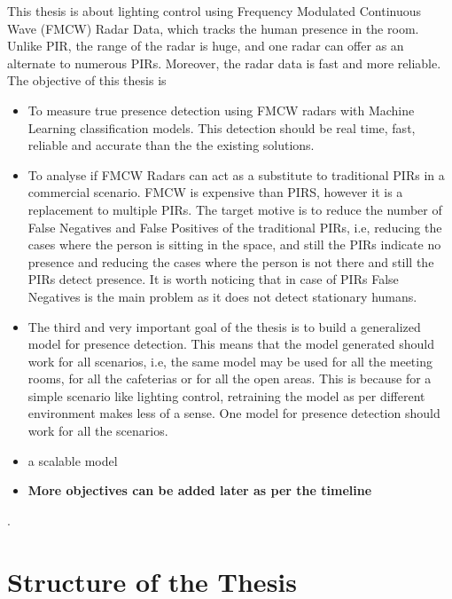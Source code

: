 This thesis is about lighting control using Frequency Modulated Continuous Wave (FMCW) Radar Data, which tracks the human presence in the room. 
Unlike PIR, the range of the radar is huge, and one radar can offer as an alternate to numerous PIRs. Moreover, the radar data is fast and more reliable. The objective of this thesis is 
\begin{itemize}
    \item To measure true presence detection using FMCW radars with Machine Learning classification models. This detection should be real time, fast, reliable and accurate than the the existing solutions.
    \item To analyse if FMCW Radars can act as a substitute to traditional PIRs in a commercial scenario. FMCW is expensive than PIRS, however it is a replacement to multiple PIRs. The target motive is to reduce the number of False Negatives and False Positives of the traditional PIRs, i.e, reducing the cases where the person is sitting in the space, and still the PIRs indicate no presence and reducing the cases where the person is not there and still the PIRs detect presence. It is worth noticing that in case of PIRs False Negatives is the main problem as it does not detect stationary humans. 
    \item The third and very important goal of the thesis is to build a generalized model for presence detection. This means that the model generated should work for all scenarios, i.e, the same model may be used for all the meeting rooms, for all the cafeterias or for all the open areas. This is because for a simple scenario like lighting control, retraining the model as per different environment makes less of a sense. One model for presence detection should work for all the scenarios.
    \item a scalable model
    \item \textbf{More objectives can be added later as per the timeline}
\end{itemize}.


\section{Structure of the Thesis}
\label{section:structure} 


